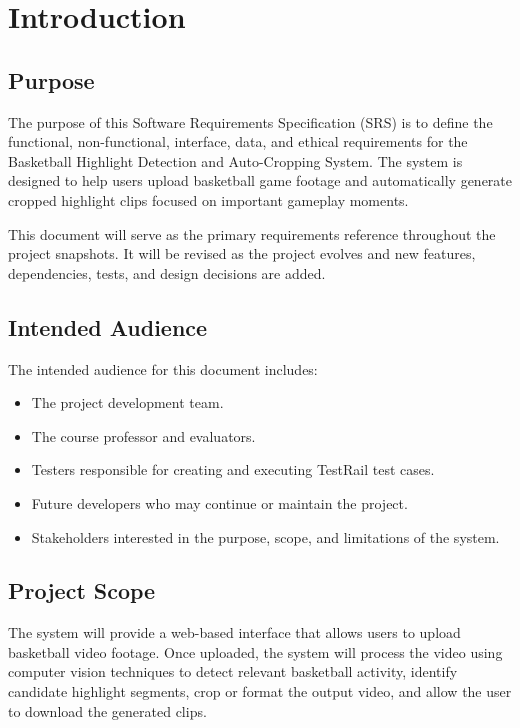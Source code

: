 \documentclass[12pt]{article}
\begin{document}
\newpage

\section{Introduction}

\subsection{Purpose}
The purpose of this Software Requirements Specification (SRS) is to define the functional, non-functional, interface, data, and ethical requirements for the Basketball Highlight Detection and Auto-Cropping System. The system is designed to help users upload basketball game footage and automatically generate cropped highlight clips focused on important gameplay moments.

This document will serve as the primary requirements reference throughout the project snapshots. It will be revised as the project evolves and new features, dependencies, tests, and design decisions are added.

\subsection{Intended Audience}
The intended audience for this document includes:
\begin{itemize}[noitemsep]
    \item The project development team.
    \item The course professor and evaluators.
    \item Testers responsible for creating and executing TestRail test cases.
    \item Future developers who may continue or maintain the project.
    \item Stakeholders interested in the purpose, scope, and limitations of the system.
\end{itemize}

\subsection{Project Scope}
The system will provide a web-based interface that allows users to upload basketball video footage. Once uploaded, the system will process the video using computer vision techniques to detect relevant basketball activity, identify candidate highlight segments, crop or format the output video, and allow the user to download the generated clips.
\end{document}
